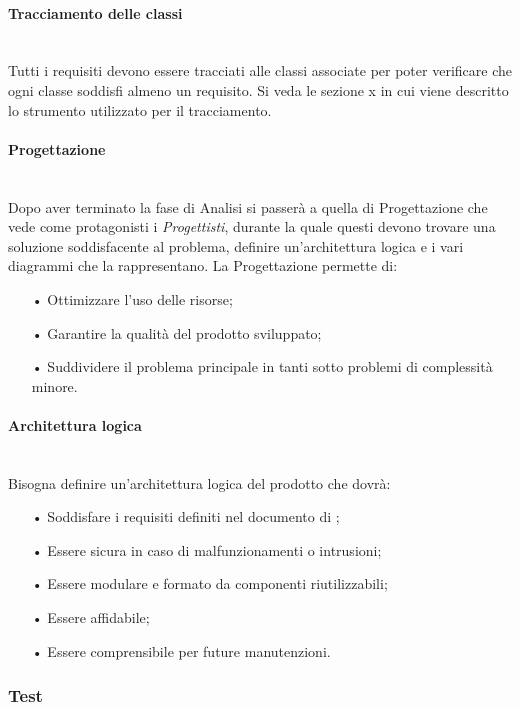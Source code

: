 \paragraph{Tracciamento delle classi}\mbox{}\\
Tutti i requisiti devono essere tracciati alle classi associate per poter verificare che ogni classe soddisfi almeno un requisito. Si veda le sezione x in cui viene descritto lo strumento
utilizzato per il tracciamento.

\paragraph{Progettazione}\mbox{}\\
Dopo aver terminato la fase di Analisi si passerà a quella di Progettazione che vede come protagonisti i \textit{Progettisti}, durante la quale questi devono trovare una soluzione soddisfacente al problema, definire un'architettura logica e i vari diagrammi che la rappresentano.
La Progettazione permette di: 
\begin{itemize}
\item[•] Ottimizzare l'uso delle risorse;
\item[•] Garantire la qualità del prodotto sviluppato;
\item[•] Suddividere il problema principale in tanti sotto problemi di complessità minore.
\end{itemize}

\paragraph{Architettura logica}\mbox{}\\
Bisogna definire un'{architettura} logica del prodotto che dovrà: 
\begin{itemize}
\item[•] Soddisfare i requisiti definiti nel documento di \AdR;
\item[•] Essere sicura in caso di malfunzionamenti o intrusioni;
\item[•] Essere {modulare} e formato da componenti riutilizzabili;
\item[•] Essere affidabile;
\item[•] Essere comprensibile per future manutenzioni.
\end{itemize}

\subsubsection{Test}

